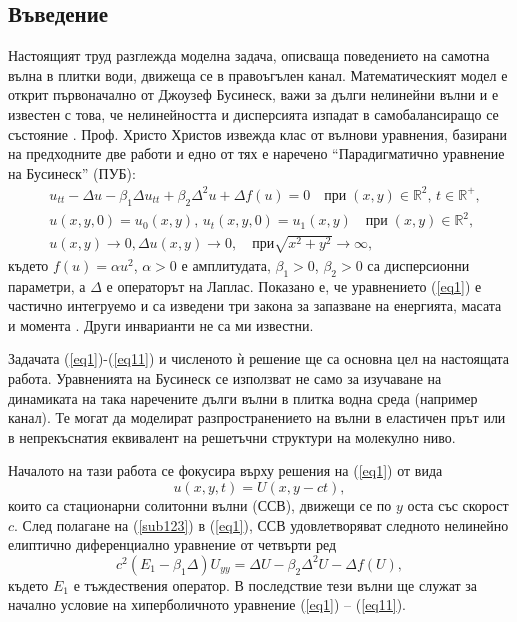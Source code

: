 \documentclass[a5paper]{article}
\newcommand{\be}{\begin{equation}}
\newcommand{\ee}{\end{equation}}
\newcommand{\rf}[1]{(\ref{#1})}
\newcommand{\RR}{\mathbb{R}}
\theoremstyle{remark}
\begin{document}
\begin{normalsize}
\section{Въведение}\label{introduction}
Настоящият труд разглежда моделна задача, описваща поведението на самотна вълна в плитки води, движеща се в правоъгълен канал. Математическият модел е открит първоначално от Джоузеф Бусинеск, важи за дълги нелинейни вълни и е известен с това, че нелинейността и дисперсията изпадат в самобалансиращо се състояние \cite{ref01,ref02}. Проф. Христо Христов \cite{ref1} извежда клас от вълнови уравнения, базирани на предходните две работи и едно от тях е наречено ``Парадигматично уравнение на Бусинеск'' (ПУБ):
\begin{align}
&u_{tt} - \Delta u -\beta_1  \Delta u_{tt} +\beta_2 \Delta ^2 u + \Delta f(u)=0   \quad \text{при} \;  (x,y) \in \RR^2, \, t\in\RR^+,\label{eq1}
\\ \nonumber &u(x,y,0)=u_0(x,y), \, u_t(x,y,0)=u_1(x,y)   \quad\text{при} \; (x,y) \in \RR^2,
\\  &u(x,y) \rightarrow 0,  \Delta u(x,y) \rightarrow 0 ,  \quad \text{при}  \sqrt{x^2 + y^2} \rightarrow \infty, \label{eq11}
\end{align}
където $f(u)=\alpha u^2$, $\alpha>0$ е амплитудата, $\beta_1>0$, $\beta_2>0$ са дисперсионни параметри, а $\Delta$ е операторът на Лаплас. Показано е, че уравнението \rf{eq1} е частично интегруемо и са изведени три закона за запазване на енергията, масата и момента \cite{ref1, ref159}. Други инварианти не са ми известни. 

Задачата \rf{eq1}-\rf{eq11} и численото ѝ решение ще са основна цел на настоящата работа. Уравненията на Бусинеск се използват не само за изучаване на динамиката на така наречените дълги вълни в плитка водна среда (например канал). Те могат да моделират разпространението на вълни в еластичен прът или в непрекъснатия еквивалент на решетъчни структури на молекулно ниво.

Началото на тази работа се фокусира върху решения на \rf{eq1} от вида 
\be\label{sub123}
u(x,y,t)=U(x,y-ct),
\ee
които са стационарни солитонни вълни (ССВ), движещи се по $y$ оста със скорост $c$. След полагане на \rf{sub123} в \rf{eq1}, ССВ удовлетворяват следното нелинейно елиптично диференциално уравнение от четвърти ред
\begin{equation}\label{eq2}
c^2 (E_1-\beta_1 \Delta) U_{yy} = \Delta U -\beta_2 \Delta^2 U - \Delta f(U),
\end{equation}
където $E_1$ е тъждествения оператор. В последствие тези вълни ще служат за начално условие на хиперболичното уравнение \rf{eq1} -- \rf{eq11}. 


\end{normalsize}
\end{document}
